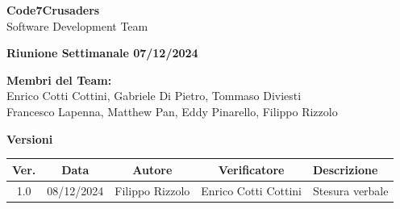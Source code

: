 \documentclass{article}
\begin{document}
\begin{titlepage}
    {\Huge \textbf{Code7Crusaders}}\\
    \vspace{0.5cm}
    {\Large Software Development Team}\\
    \vspace{2cm}
    
    {\large \textbf{Riunione Settimanale 07/12/2024}}\\ 
    \vspace{5cm}                           
    
    
    \textbf{Membri del Team:}\\
    Enrico Cotti Cottini, Gabriele Di Pietro, Tommaso Diviesti \\
    Francesco Lapenna, Matthew Pan, Eddy Pinarello, Filippo Rizzolo \\
    \vspace{0.5cm}
    
    \vspace{1cm}
\end{titlepage}



\newpage
\begin{table}[h!]
\centering
\textbf{Versioni} \\ %
\vspace{2mm} %
\begin{tabular}{|c|c|c|c|>{\raggedright\arraybackslash}p{}|}
    \hline
    \textbf{Ver.} & \textbf{Data} & \textbf{Autore} & \textbf{Verificatore} & \textbf{Descrizione} \\
    \hline
    1.0 & 08/12/2024 & Filippo Rizzolo & Enrico Cotti Cottini & Stesura verbale \\ 
    \hline                                  
\end{tabular}
\end{table}



\newpage
\tableofcontents



\newpage
\end{document}
